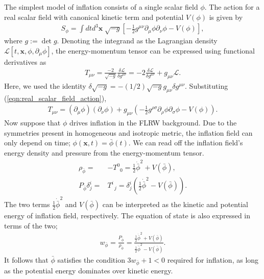 \documentclass[a4paper,12pt,times,custombib,print,index]{Classes/PhDThesisPSnPDF} %
\newcommand{\Lagr}{\mathcal{L}}		\newcommand{\Hami}{\mathcal{H}}		\newcommand{\vv}{\mathbf}			\newcommand{\pluseq}{\mathrel{+}=}	%
\providecommand{\DIFadd}[1]{{\protect\color{blue}\uwave{#1}}} %
\providecommand{\DIFaddbegin}{} %
\providecommand{\DIFaddend}{} %
\newcommand{\DIFaddincludegraphics}[2][]{{\color{blue}\fbox{\DIFOincludegraphics[#1]{#2}}}} %
\DeclareRobustCommand{\DIFaddbegin}{\DIFOaddbegin \let\includegraphics\DIFaddincludegraphics} %
\DeclareRobustCommand{\DIFaddend}{\DIFOaddend \let\includegraphics\DIFOincludegraphics} %
\begin{document}
The simplest model of inflation consists of a single scalar field $\phi$. The action for a real scalar field with canonical kinetic term and potential $V(\phi)$ is given by
\begin{align}
	S_\phi = \int dt d^3 \vv{x} \; \sqrt{-g} \left[ -\frac{1}{2} g^{\mu\nu} \partial_\mu \phi \partial_\nu \phi - V(\phi) \right],		\label{eqn:real_scalar_field_action}
\end{align}
where $g:=\det g$. Denoting the integrand as the Lagrangian density $\Lagr[t, \vv{x}, \phi, \partial_\mu \phi]$, the energy-momentum tensor can be expressed using functional derivatives as
\begin{align}
	T_{\mu\nu} = \frac{-2}{\sqrt{-g}} \frac{\delta\Lagr}{\delta g^{\mu\nu}} = -2 \frac{\delta \Lagr}{\delta g^{\mu\nu}} + g_{\mu\nu} \Lagr.
\end{align}
Here, we used the identity $\delta\sqrt{-g} = -(1/2) \sqrt{-g} g_{\mu\nu} \delta g^{\mu\nu}$. Substituting (\ref{eqn:real_scalar_field_action}),
\begin{align}
	T_{\mu\nu} = \left( \partial_\mu \phi \right) \left( \partial_\nu \phi \right) + g_{\mu\nu} \left( -\frac{1}{2} g^{\rho\sigma} \partial_\rho \phi \partial_\sigma \phi - V(\phi) \right).
\end{align}
Now suppose that $\phi$ drives inflation in the FLRW background. Due to the symmetries present in \DIFaddbegin \DIFadd{the }\DIFaddend homogeneous and isotropic metric, the inflation field can only depend on time; $\phi(\vv{x}, t) = \bar{\phi}(t)$. We can read off the inflation field's energy density and pressure from the energy-momentum tensor.
\begin{align}
	\rho_{\bar{\phi}} =& -T^0_{\;\;0} = \frac{1}{2} \dot{\bar{\phi}}^2 + V(\bar{\phi}),	\\
	P_{\bar{\phi}} \delta^i_j =& T^i_{\;\;j} = \delta^i_j \left( \frac{1}{2} \dot{\bar{\phi}}^2 - V(\bar{\phi}) \right).
\end{align}
The two terms $\frac{1}{2} \dot{\bar{\phi}}^2$ and $V(\bar{\phi})$ can be interpreted as the kinetic and potential energy of \DIFaddbegin \DIFadd{the }\DIFaddend inflation field, respectively. The equation of state is also expressed in terms of the two;
\begin{align}
	w_{\bar{\phi}} = \frac{P_{\bar{\phi}}}{\rho_{\bar{\phi}}} = \frac{\frac{1}{2} \dot{\bar{\phi}}^2 + V(\bar{\phi})}{\frac{1}{2} \dot{\bar{\phi}}^2 - V(\bar{\phi})}.
\end{align}
It follows that $\bar{\phi}$ satisfies the condition $3w_{\bar{\phi}}+1<0$ required for inflation, as long as the potential energy dominates over kinetic energy.
\end{document}
